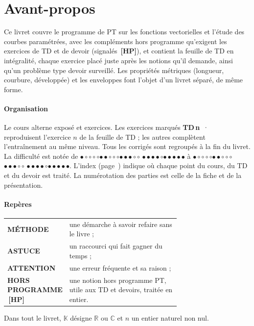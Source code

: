 \documentclass[a4paper,11pt]{article}
\numberwithin{equation}{section}
\numberwithin{figure}{section}
\numberwithin{table}{section}
\theoremstyle{enonce}
\theoremstyle{exemple}
\theoremstyle{remarque}
\newcommand{\niveau}[1]{{\color{Ocre}\footnotesize
  \ifcase#1\or$\bullet\circ\circ\circ\circ$\or$\bullet\bullet\circ\circ\circ$\or$\bullet\bullet\bullet\circ\circ$%
  \or$\bullet\bullet\bullet\bullet\circ$\or$\bullet\bullet\bullet\bullet\bullet$\fi}}
\newcommand{\K}{\mathbb{K}}
\newcommand{\R}{\mathbb{R}}
\newcommand{\C}{\mathbb{C}}
\newcommand{\HP}{\,{\sffamily\bfseries\scriptsize\textcolor{Brique}{[HP]}}}
\newcommand{\TD}[1]{{\color{Ocre}\bfseries TD\,#1}\ ·\ }
\begin{document}
\thispagestyle{plain}
\section*{Avant-propos}

Ce livret couvre le programme de PT sur les fonctions vectorielles et l'étude des courbes paramétrées, avec les compléments hors
programme qu'exigent les exercices de TD et de devoir (signalés \HP), et contient la feuille de TD en intégralité, chaque exercice
placé juste après les notions qu'il demande, ainsi qu'un problème type devoir surveillé. Les propriétés métriques (longueur,
courbure, développée) et les enveloppes font l'objet d'un livret séparé, de même forme.

\paragraph{Organisation} Le cours alterne exposé et exercices. Les exercices marqués \TD{n} reproduisent l'exercice
$n$ de la feuille de TD ; les autres complètent l'entraînement au même niveau. Tous les corrigés sont regroupés à la fin
du livret. La difficulté est notée de \niveau{1} à \niveau{5}. L'index (page~\pageref{sec:corresp}) indique où
chaque point du cours, du TD et du devoir est traité. La numérotation des parties est celle de la fiche et de la présentation.

\paragraph{Repères}
\begin{center}
\renewcommand{\arraystretch}{1.25}\small
\begin{tabular}{>{\sffamily\bfseries\footnotesize}l p{0.7\linewidth}}
\colorbox{Bleu}{\color{white}MÉTHODE} & une démarche à savoir refaire sans le livre ;\\
\color{Ocre}ASTUCE & un raccourci qui fait gagner du temps ;\\
\color{Brique}ATTENTION & une erreur fréquente et sa raison ;\\
\color{Brique}HORS PROGRAMME \HP & une notion hors programme PT, utile aux TD et devoirs, traitée en entier.\\
\end{tabular}
\end{center}

Dans tout le livret, $\K$ désigne $\R$ ou $\C$ et $n$ un entier naturel non nul.
\end{document}

